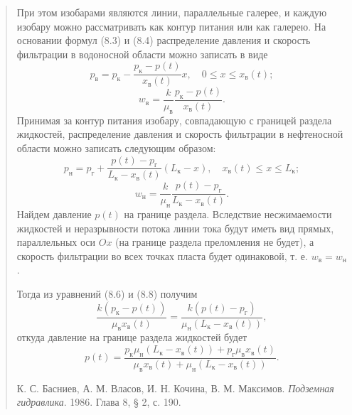 \documentclass[12pt,a4paper]{article}
\begin{document}
\begin{quote}\sloppy
При этом изобарами являются линии, параллельные галерее, и каждую изобару можно рассматривать как контур питания или как галерею. На основании формул (8.3) и (8.4) распределение давления и скорость фильтрации в водоносной области можно записать в виде
\begin{equation}p_\text{в}=p_\text{к}-\frac{p_\text{к}-p(t)}{x_\text{в}(t)}x,\quad0\le x\le x_\text{в}(t);\tag{8.5}\label{q9:eq-8-5}\end{equation}
\begin{equation}w_\text{в}=\frac{k}{\mu_\text{в}}\frac{p_\text{к}-p(t)}{x_\text{в}(t)}.\tag{8.6}\label{q9:eq-8-6}\end{equation}
Принимая за контур питания изобару, совпадающую с границей раздела жидкостей, распределение давления и скорость фильтрации в нефтеносной области можно записать следующим образом:
\begin{equation}p_\text{н}=p_\text{г}+\frac{p(t)-p_\text{г}}{L_\text{к}-x_\text{в}(t)}(L_\text{к}-x),\quad x_\text{в}(t)\le x\le L_\text{к};\tag{8.7}\label{q9:eq-8-7}\end{equation}
\begin{equation}w_\text{н}=\frac{k}{\mu_\text{н}}\frac{p(t)-p_\text{г}}{L_\text{к}-x_\text{в}(t)}.\tag{8.8}\label{q9:eq-8-8}\end{equation}
Найдем давление $p(t)$ на границе раздела. Вследствие несжимаемости жидкостей и неразрывности потока линии тока будут иметь вид прямых, параллельных оси $Ox$ (на границе раздела преломления не будет), а скорость фильтрации во всех точках пласта будет одинаковой, т. е. $w_\text{в}=w_\text{н}$.

Тогда из уравнений (8.6) и (8.8) получим
\begin{equation}\frac{k(p_\text{к}-p(t))}{\mu_\text{в}x_\text{в}(t)}=\frac{k(p(t)-p_\text{г})}{\mu_\text{н}(L_\text{к}-x_\text{в}(t))},\tag{8.9}\label{q9:eq-8-9}\end{equation}
откуда давление на границе раздела жидкостей будет
\begin{equation}p(t)=\frac{p_\text{к}\mu_\text{н}(L_\text{к}-x_\text{в}(t))+p_\text{г}\mu_\text{в}x_\text{в}(t)}{\mu_\text{в}x_\text{в}(t)+\mu_\text{н}(L_\text{к}-x_\text{в}(t))}.\tag{8.10}\label{q9:eq-8-10}\end{equation}
\par\nobreak\smallskip
{\small К. С. Басниев, А. М. Власов, И. Н. Кочина, В. М. Максимов. \textit{Подземная гидравлика}. 1986. Глава 8, § 2, с. 190.}\par
\end{quote}
\end{document}
